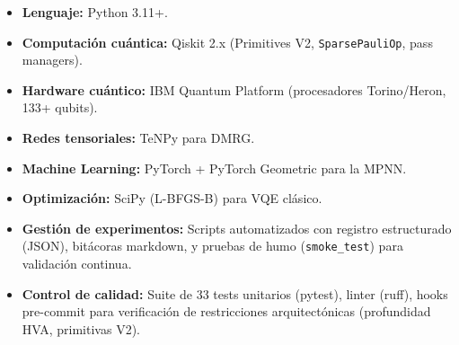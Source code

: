 \documentclass[11pt,a4paper,spanish]{book}
\begin{document}
\begin{itemize}
    \item \textbf{Lenguaje:} Python 3.11+.
    \item \textbf{Computación cuántica:} Qiskit 2.x (Primitives V2, \texttt{SparsePauliOp}, pass managers).
    \item \textbf{Hardware cuántico:} IBM Quantum Platform (procesadores Torino/Heron, 133+ qubits).
    \item \textbf{Redes tensoriales:} TeNPy \citep{hauschild2018} para DMRG.
    \item \textbf{Machine Learning:} PyTorch + PyTorch Geometric \citep{fey2019} para la MPNN.
    \item \textbf{Optimización:} SciPy (L-BFGS-B) para VQE clásico.
    \item \textbf{Gestión de experimentos:} Scripts automatizados con registro estructurado (JSON), bitácoras markdown, y pruebas de humo (\texttt{smoke\_test}) para validación continua.
    \item \textbf{Control de calidad:} Suite de 33 tests unitarios (pytest), linter (ruff), hooks pre-commit para verificación de restricciones arquitectónicas (profundidad HVA, primitivas V2).
\end{itemize}
\end{document}
